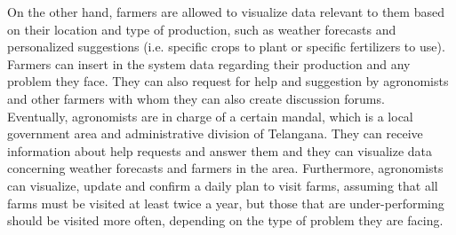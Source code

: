 On the other hand, farmers are allowed to visualize data relevant to them based on their location and type of production, such as weather forecasts and personalized suggestions (i.e. specific crops to plant or specific fertilizers to use). Farmers can insert in the system data regarding their production and any problem they face. They can also request for help and suggestion by agronomists and other farmers with whom they can also create discussion forums.\\

Eventually, agronomists are in charge of a certain mandal, which is a local government area and administrative division of Telangana. They can receive information about help requests and answer them and they can visualize data concerning weather forecasts and farmers in the area. Furthermore, agronomists can visualize, update and confirm a daily plan to visit farms, assuming that all farms must be visited at least twice a year, but those that are under-performing should be visited more often, depending on the type of problem they are facing.

